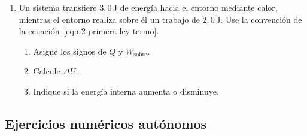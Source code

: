 \begin{enumerate}[label=\textbf{NG\arabic*.},leftmargin=*]
    \item Un sistema transfiere \(3{,}0\,\text{J}\) de energía hacia el entorno
    mediante calor, mientras el entorno realiza sobre él un trabajo de
    \(2{,}0\,\text{J}\). Use la convención de la
    ecuación~\eqref{eq:u2-primera-ley-termo}.
    \begin{enumerate}[label=\alph*)]
        \item Asigne los signos de \(Q\) y \(W_\mathrm{sobre}\).
        \item Calcule \(\Delta U\).
        \item Indique si la energía interna aumenta o disminuye.
    \end{enumerate}
\end{enumerate}

\subsection*{Ejercicios numéricos autónomos}

